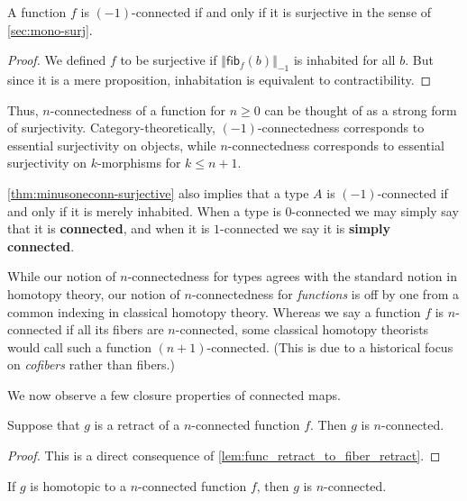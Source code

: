 \documentclass[10pt,a4paper]{article}
\providecommand{\index}[1]{}
\newcommand{\define}[1]{\textbf{#1}}
\newcommand{\hfib}[2]{{\mathsf{fib}}_{#1}(#2)}
\let\hfiber\hfib
\newcommand{\trunc}[2]{\mathopen{}\left\Vert #2\right\Vert_{#1}\mathclose{}}
\theoremstyle{definition}
\theoremstyle{remark}
\numberwithin{equation}{section}
\newcommand{\indexdef}[1]{\index{#1|defstyle}}   %
\begin{document}
\begin{lem}\label{thm:minusoneconn-surjective}
  \index{function!surjective}%
  A function $f$ is $(-1)$-connected if and only if it is surjective in the sense of \cref{sec:mono-surj}.
\end{lem}
\begin{proof}
  We defined $f$ to be surjective if $\trunc{-1}{\hfiber f b}$ is inhabited for all $b$.
  But since it is a mere proposition, inhabitation is equivalent to contractibility.
\end{proof}

Thus, $n$-connectedness of a function for $n\ge 0$ can be thought of as a strong form of surjectivity.
Category-theoretically, $(-1)$-connectedness corresponds to essential surjectivity on objects, while $n$-connectedness corresponds to essential surjectivity on $k$-morphisms for $k\le n+1$.

\cref{thm:minusoneconn-surjective} also implies that a type $A$ is $(-1)$-connected if and only if it is merely inhabited.
When a type is $0$-connected we may simply say that it is \define{connected},
\indexdef{connected!type}%
\indexdef{type!connected}%
and when it is $1$-connected we say it is \define{simply connected}.
\indexdef{simply connected type}%
\indexdef{type!simply connected}%

\begin{rmk}\label{rmk:connectedness-indexing}
  While our notion of $n$-connectedness for types agrees with the standard notion in homotopy theory, our notion of $n$-connectedness for \emph{functions} is off by one from a common indexing in classical homotopy theory.
  Whereas we say a function $f$ is $n$-connected if all its fibers are $n$-connected, some classical homotopy theorists would call such a function $(n+1)$-connected.
  (This is due to a historical focus on \emph{cofibers} rather than fibers.)
\end{rmk}

We now observe a few closure properties of connected maps.
\index{function!n-connected@$n$-connected}

\begin{lem}
\index{retract!of a function}%
Suppose that $g$ is a retract of a $n$-connected function $f$.  Then $g$ is
$n$-connected.
\end{lem}
\begin{proof}
This is a direct consequence of \cref{lem:func_retract_to_fiber_retract}.
\end{proof}

\begin{cor}
If $g$ is homotopic to a $n$-connected function $f$, then $g$ is $n$-connected.
\end{cor}
\end{document}

